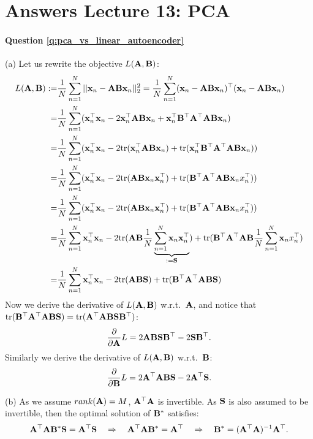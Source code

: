 \section{Answers Lecture 13: PCA}

\paragraph{Question \ref{q:pca_vs_linear_autoencoder}}
(a) Let us rewrite the objective $L(\mathbf A, \mathbf B)$:
\begin{equation*}
\begin{aligned}
L(\mathbf A, \mathbf B) :=& \frac{1}{N} \sum_{n=1}^N || \mathbf{x}_n - \mathbf A \mathbf B \mathbf{x}_n ||_2^2 = \frac{1}{N} \sum_{n=1}^N (\mathbf{x}_n - \mathbf A \mathbf B \mathbf{x}_n)^\top (\mathbf{x}_n - \mathbf A \mathbf B \mathbf{x}_n) \\
=& \frac{1}{N} \sum_{n=1}^N (\mathbf{x}_n^\top \mathbf{x}_n - 2 \mathbf{x}_n^\top \mathbf A \mathbf B \mathbf{x}_n + \mathbf{x}_n^\top \mathbf B^\top \mathbf A^\top \mathbf A \mathbf B \mathbf{x}_n) \\
=& \frac{1}{N} \sum_{n=1}^N (\mathbf{x}_n^\top \mathbf{x}_n - 2 \text{tr}(\mathbf{x}_n^\top \mathbf A \mathbf B \mathbf{x}_n) + \text{tr}(\mathbf{x}_n^\top \mathbf B^\top \mathbf A^\top \mathbf A \mathbf B \mathbf{x}_n)) \\
=& \frac{1}{N} \sum_{n=1}^N (\mathbf{x}_n^\top \mathbf{x}_n - 2 \text{tr}(\mathbf A \mathbf B \mathbf{x}_n \mathbf{x}_n^\top ) + \text{tr}(\mathbf B^\top \mathbf A^\top \mathbf A \mathbf B \mathbf{x}_n x_n^\top )) \\
=& \frac{1}{N} \sum_{n=1}^N (\mathbf{x}_n^\top \mathbf{x}_n - 2 \text{tr}(\mathbf A \mathbf B \mathbf{x}_n \mathbf{x}_n^\top ) + \text{tr}(\mathbf B^\top \mathbf A^\top \mathbf A \mathbf B \mathbf{x}_n x_n^\top )) \\
=& \frac{1}{N} \sum_{n=1}^N \mathbf{x}_n^\top \mathbf{x}_n - 2 \text{tr}(\mathbf A \mathbf B \frac{1}{N} \underbrace{\sum_{n=1}^N \mathbf{x}_n \mathbf{x}_n^\top}_{:=\mathbf{S}} ) + \text{tr}(\mathbf B^\top \mathbf A^\top \mathbf A \mathbf B \frac{1}{N} \sum_{n=1}^N \mathbf{x}_n x_n^\top ) \\
=& \frac{1}{N} \sum_{n=1}^N \mathbf{x}_n^\top \mathbf{x}_n - 2 \text{tr}(\mathbf A \mathbf B \mathbf{S} ) + \text{tr}(\mathbf B^\top \mathbf A^\top \mathbf A \mathbf B \mathbf{S} )
\end{aligned}
\end{equation*}
Now we derive the derivative of $L(\mathbf A, \mathbf B)$ w.r.t.~$\mathbf A$, and notice that $ \text{tr}(\mathbf B^\top \mathbf A^\top \mathbf A \mathbf B \mathbf{S} ) =  \text{tr}(\mathbf A^\top \mathbf A \mathbf B \mathbf{S} \mathbf B^\top )$:
\begin{equation*}
\frac{\partial}{\partial \mathbf A} L = 2 \mathbf A \mathbf B \mathbf{S} \mathbf B^\top - 2 \mathbf{S} \mathbf B^\top.
\end{equation*}
Similarly we derive the derivative of $L(\mathbf A, \mathbf B)$ w.r.t.~$\mathbf B$:
\begin{equation*}
\frac{\partial}{\partial \mathbf B} L = 2 \mathbf A^\top \mathbf A \mathbf B \mathbf{S} - 2 \mathbf A^\top \mathbf{S}.
\end{equation*}

(b) As we assume $rank(\mathbf A) = M$, $\mathbf A^\top \mathbf A$ is invertible. As $\mathbf{S}$ is also assumed to be invertible, then the optimal solution of $\mathbf B^*$ satisfies:
$$ \mathbf A^\top \mathbf A \mathbf B^* \mathbf{S} =\mathbf A^\top \mathbf{S} \quad \Rightarrow \quad  \mathbf A^\top \mathbf A \mathbf B^* =\mathbf A^\top \quad \Rightarrow \quad \mathbf B^* = (\mathbf A^\top \mathbf A)^{-1} \mathbf A^\top.$$

